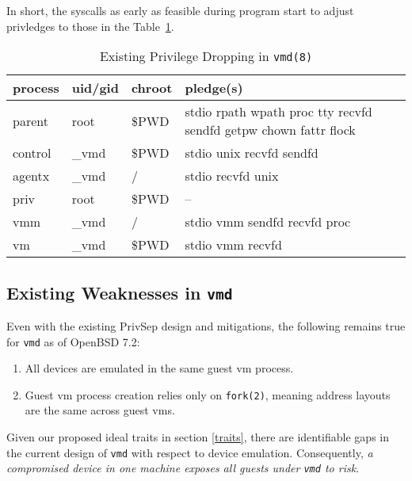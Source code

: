 \documentclass[conference]{IEEEtran}
\begin{document}
In short, the syscalls as early as feasible during program start to
adjust privledges to those in the Table~\ref{tab1}.

\vspace{2mm}
\begin{table}
\begin{center}
\caption{\label{tab1}Existing Privilege Dropping in \texttt{vmd(8)}}
\begin{tabular}{| l | l | l | p{3cm} |}
  \hline
  process & uid/gid & chroot & pledge(s) \\ \hline
  parent & root & \$PWD & stdio rpath wpath proc tty recvfd sendfd getpw chown fattr flock \\ \hline
  control & \_vmd & \$PWD & stdio unix recvfd sendfd \\ \hline
  agentx & \_vmd & / & stdio recvfd unix \\ \hline
  priv & root & \$PWD & -- \\ \hline
  vmm & \_vmd & / & stdio vmm sendfd recvfd proc \\ \hline
  vm & \_vmd & \$PWD & stdio vmm recvfd \\
  \hline
\end{tabular}
\end{center}
\end{table}
\vspace{2mm}

\vspace{3mm}
\subsection{Existing Weaknesses in \texttt{vmd}}
Even with the existing PrivSep design and mitigations, the following
remains true for \texttt{vmd} as of OpenBSD 7.2:

\vspace{2mm}
\begin{enumerate}
\item All devices are emulated in the same guest vm process.
\item Guest vm process creation relies only on \texttt{fork(2)},
  meaning address layouts are the same across guest vms.
\end{enumerate}
\vspace{2mm}

Given our proposed ideal traits in section \ref{traits}, there are
identifiable gaps in the current design of \texttt{vmd} with respect
to device emulation. Consequently, \emph{a compromised device in one
machine exposes all guests under \texttt{vmd} to risk}.
\end{document}
